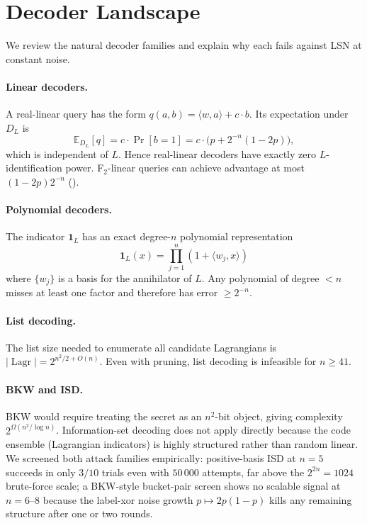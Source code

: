 \documentclass[11pt,a4paper]{article}
\theoremstyle{plain}
\theoremstyle{definition}
\newcommand{\E}{\mathbb{E}}
\DeclareMathOperator{\Lagr}{Lagr}
\begin{document}
\section{Decoder Landscape}
\label{sec:decoders}

We review the natural decoder families and explain why each fails against LSN at constant noise.

\paragraph{Linear decoders.}
A real-linear query has the form $q(a,b) = \langle w, a \rangle + c \cdot b$. Its expectation under $D_L$ is
\[
\E_{D_L}[q] = c \cdot \Pr[b=1] = c \cdot \bigl(p + 2^{-n}(1-2p)\bigr),
\]
which is independent of $L$. Hence real-linear decoders have exactly zero $L$-identification power. F$_2$-linear queries can achieve advantage at most $(1-2p)2^{-n}$ ().

\paragraph{Polynomial decoders.}
The indicator $\mathbf{1}_L$ has an exact degree-$n$ polynomial representation
\[
\mathbf{1}_L(x) = \prod_{j=1}^n (1 + \langle w_j, x \rangle)
\]
where $\{w_j\}$ is a basis for the annihilator of $L$. Any polynomial of degree $< n$ misses at least one factor and therefore has error $\geq 2^{-n}$.

\paragraph{List decoding.}
The list size needed to enumerate all candidate Lagrangians is $|\Lagr| = 2^{n^2/2 + O(n)}$. Even with pruning, list decoding is infeasible for $n \geq 41$.

\paragraph{BKW and ISD.}
BKW would require treating the secret as an $n^2$-bit object, giving complexity $2^{\Omega(n^2 / \log n)}$. Information-set decoding does not apply directly because the code ensemble (Lagrangian indicators) is highly structured rather than random linear.  We screened both attack families empirically: positive-basis ISD at $n=5$ succeeds in only $3/10$ trials even with $50\,000$ attempts, far above the $2^{2n}=1024$ brute-force scale; a BKW-style bucket-pair screen shows no scalable signal at $n=6$--$8$ because the label-xor noise growth $p\mapsto2p(1-p)$ kills any remaining structure after one or two rounds.
\end{document}
